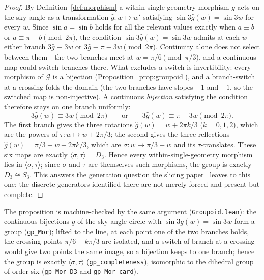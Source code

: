 \documentclass[11pt,a4paper]{article}
\theoremstyle{definition}
\begin{document}
\begin{proof}
By Definition~\ref{def:morphism} a within-single-geometry morphism $g$ acts on the sky angle as a transformation $\hat{g}:w\mapsto w'$ satisfying $\sin 3\hat{g}(w)=\sin 3w$ for every $w$. Since $\sin a=\sin b$ holds for all the relevant values exactly when $a\equiv b$ or $a\equiv \pi-b \pmod{2\pi}$, the condition $\sin 3\hat{g}(w)=\sin 3w$ admits at each $w$ either branch $3\hat{g}\equiv 3w$ or $3\hat{g}\equiv\pi-3w \pmod{2\pi}$. Continuity alone does not select between them---the two branches meet at $w=\pi/6 \pmod{\pi/3}$, and a continuous map could switch branches there. What excludes a switch is invertibility: every morphism of $\mathcal{G}$ is a bijection (Proposition~\ref{prop:groupoid}), and a branch-switch at a crossing folds the domain (the two branches have slopes $+1$ and $-1$, so the switched map is non-injective). A continuous \emph{bijection} satisfying the condition therefore stays on one branch uniformly:
\[
3\hat{g}(w)\equiv 3w \pmod{2\pi}\qquad\text{or}\qquad 3\hat{g}(w)\equiv \pi-3w \pmod{2\pi}.
\]
The first branch gives the three rotations $\hat{g}(w)=w+2\pi k/3$ ($k=0,1,2$), which are the powers of $\tau:w\mapsto w+2\pi/3$; the second gives the three reflections $\hat{g}(w)=\pi/3-w+2\pi k/3$, which are $\sigma:w\mapsto\pi/3-w$ and its $\tau$-translates. These six maps are exactly $\langle\sigma,\tau\rangle=D_{3}$. Hence every within-single-geometry morphism lies in $\langle\sigma,\tau\rangle$; since $\sigma$ and $\tau$ are themselves such morphisms, the group is exactly $D_{3}\cong S_{3}$. This answers the generation question the slicing paper~\cite{JanzenSlicing} leaves to this one: the discrete generators identified there are not merely forced and present but complete.
\end{proof}

The proposition is machine-checked by the same argument (\texttt{Groupoid.lean}): the continuous bijections $g$ of the sky-angle circle with $\sin3g(w)=\sin3w$ form a group (\texttt{gp\_Mor}); lifted to the line, at each point one of the two branches holds, the crossing points $\pi/6+k\pi/3$ are isolated, and a switch of branch at a crossing would give two points the same image, so a bijection keeps to one branch; hence the group is exactly $\langle\sigma,\tau\rangle$ (\texttt{gp\_completeness}), isomorphic to the dihedral group of order six (\texttt{gp\_Mor\_D3} and \texttt{gp\_Mor\_card}).
\end{document}
